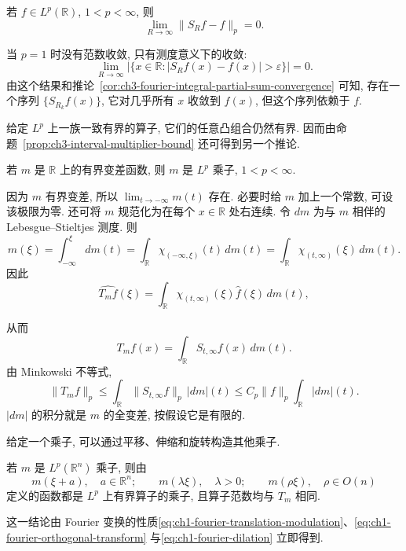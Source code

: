 \begin{Corollary}
\label{cor:ch3-fourier-integral-partial-sum-convergence}
若 $f\in L^p(\mathbb R)$, $1<p<\infty$, 则
\[
 \lim_{R\to\infty}\|S_Rf-f\|_p=0.
\]
\end{Corollary}

当 $p=1$ 时没有范数收敛, 只有测度意义下的收敛:
\[
 \lim_{R\to\infty}\bigl|\{x\in\mathbb R:|S_Rf(x)-f(x)|>\varepsilon\}\bigr|=0.
\]
由这个结果和推论~\ref{cor:ch3-fourier-integral-partial-sum-convergence} 可知, 存在一个序列 $\{S_{R_k}f(x)\}$, 它对几乎所有 $x$ 收敛到 $f(x)$, 但这个序列依赖于 $f$.

给定 $L^p$ 上一族一致有界的算子, 它们的任意凸组合仍然有界. 因而由命题~\ref{prop:ch3-interval-multiplier-bound} 还可得到另一个推论.

\begin{Corollary}
\label{cor:ch3-bounded-variation-multiplier}
若 $m$ 是 $\mathbb R$ 上的有界变差函数, 则 $m$ 是 $L^p$ 乘子, $1<p<\infty$.
\end{Corollary}

\begin{Proof}
因为 $m$ 有界变差, 所以 $\lim_{t\to-\infty}m(t)$ 存在. 必要时给 $m$ 加上一个常数, 可设该极限为零. 还可将 $m$ 规范化为在每个 $x\in\mathbb R$ 处右连续. 令 $dm$ 为与 $m$ 相伴的 Lebesgue--Stieltjes 测度. 则
\[
 m(\xi)=\int_{-\infty}^{\xi}dm(t)
 =\int_{\mathbb R}\chi_{(-\infty,\xi)}(t)\,dm(t)
 =\int_{\mathbb R}\chi_{(t,\infty)}(\xi)\,dm(t).
\]
因此
\[
 \widehat{T_mf}(\xi)
 =\int_{\mathbb R}\chi_{(t,\infty)}(\xi)\widehat f(\xi)\,dm(t),
\]

\hypertarget{chapter-03-page-072}{}
从而
\[
 T_mf(x)=\int_{\mathbb R}S_{t,\infty}f(x)\,dm(t).
\]
由 Minkowski 不等式,
\[
 \|T_mf\|_p
 \le\int_{\mathbb R}\|S_{t,\infty}f\|_p\,|dm|(t)
 \le C_p\|f\|_p\int_{\mathbb R}|dm|(t).
\]
$|dm|$ 的积分就是 $m$ 的全变差, 按假设它是有限的.
\end{Proof}

给定一个乘子, 可以通过平移、伸缩和旋转构造其他乘子.

\begin{Proposition}
\label{prop:ch3-multiplier-transformations}
若 $m$ 是 $L^p(\mathbb R^n)$ 乘子, 则由
\[
 m(\xi+a),\quad a\in\mathbb R^n;
 \qquad m(\lambda\xi),\quad\lambda>0;
 \qquad m(\rho\xi),\quad\rho\in O(n)
\]
定义的函数都是 $L^p$ 上有界算子的乘子, 且算子范数均与 $T_m$ 相同.
\end{Proposition}

这一结论由 Fourier 变换的性质\eqref{eq:ch1-fourier-translation-modulation}、\eqref{eq:ch1-fourier-orthogonal-transform} 与\eqref{eq:ch1-fourier-dilation} 立即得到.

